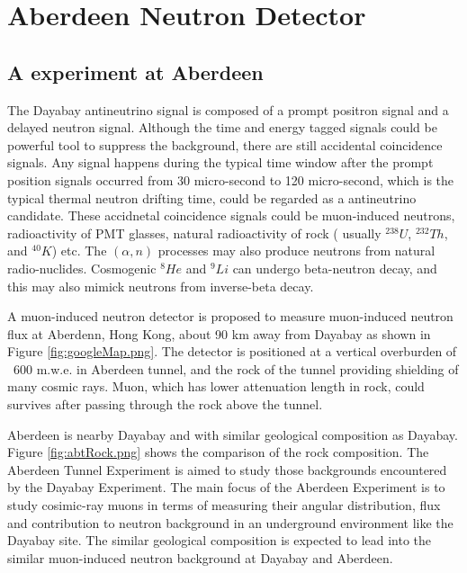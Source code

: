 \chapter{Aberdeen Neutron Detector}
\section{A experiment at Aberdeen}

The Dayabay antineutrino signal is composed of a prompt positron signal and a delayed
neutron signal. Although the time and energy tagged signals could be powerful tool to suppress
the background, there are still accidental coincidence signals. Any signal happens during
the typical time window after the prompt position signals occurred from 30 micro-second to 120 micro-second,
which is the typical thermal neutron drifting time, 
could be regarded as a antineutrino candidate. These accidnetal coincidence signals could be
muon-induced neutrons, radioactivity of PMT glasses, natural radioactivity of rock
( usually $^{238}U$, $^{232}Th$, and $^{40}K$) etc. The $(\alpha,n)$ processes may also produce
neutrons from natural radio-nuclides. Cosmogenic $^8He$ and $^9Li$ can undergo beta-neutron decay,
and this may also mimick neutrons from inverse-beta decay.


A muon-induced neutron detector is proposed to measure muon-induced neutron flux at Aberdenn, Hong Kong,
about 90 km away from Dayabay as shown in Figure \ref{fig:googleMap.png}.
The detector is positioned at a vertical overburden of ~600 m.w.e. in Aberdeen tunnel, and the rock of the tunnel
providing shielding of many cosmic rays. Muon, which has lower attenuation length in rock, could
survives after passing through the rock above the tunnel.

Aberdeen is nearby Dayabay and with similar geological composition as Dayabay. Figure \ref{fig:abtRock.png}
shows the comparison of the rock composition.
The Aberdeen Tunnel Experiment is aimed to study those backgrounds encountered by the Dayabay
Experiment. The main focus of the Aberdeen Experiment is to study cosimic-ray muons in terms
of measuring their angular distribution, flux and contribution to neutron background in an
underground environment like the Dayabay site. The similar geological composition
is expected to lead into the similar muon-induced neutron background at Dayabay and Aberdeen.


